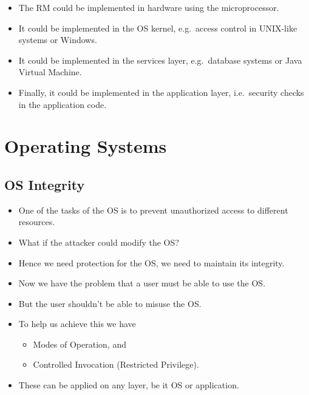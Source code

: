 \begin{frame}
  \begin{itemize}
    \item The RM could be implemented in hardware using the microprocessor.

    \item It could be implemented in the OS kernel, e.g.\ access control in 
      UNIX-like systems or Windows.

    \item It could be implemented in the services layer, e.g.\ database systems 
      or Java Virtual Machine.

    \item Finally, it could be implemented in the application layer, i.e.\ 
      security checks in the application code.

  \end{itemize}
\end{frame}


\section{Operating Systems}

\subsection{OS Integrity}

\begin{frame}
  \begin{itemize}
    \item One of the tasks of the OS is to prevent unauthorized access to 
      different resources.

    \item What if the attacker could modify the OS\@?

    \item Hence we need protection for the OS, we need to maintain its 
      integrity.

  \end{itemize}
\end{frame}

\begin{frame}
  \begin{itemize}
    \item Now we have the problem that a user must be able to use the OS\@.

    \item But the user shouldn't be able to misuse the OS\@.

    \item To help us achieve this we have
      \begin{itemize}
        \item Modes of Operation, and
        \item Controlled Invocation (Restricted Privilege).
      \end{itemize}

    \item These can be applied on any layer, be it OS or application.

  \end{itemize}
\end{frame}

